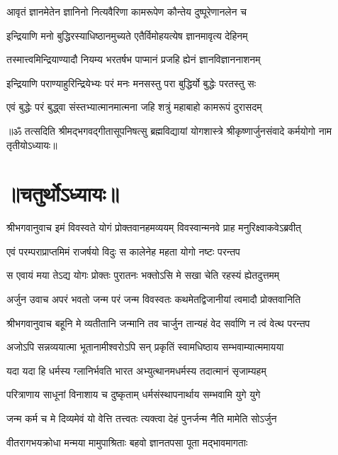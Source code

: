 \twolineshloka
{आवृतं ज्ञानमेतेन ज्ञानिनो नित्यवैरिणा}
{कामरूपेण कौन्तेय दुष्पूरेणानलेन च}%

\twolineshloka
{इन्द्रियाणि मनो बुद्धिरस्याधिष्ठानमुच्यते}
{एतैर्विमोहयत्येष ज्ञानमावृत्य देहिनम्}%

\twolineshloka
{तस्मात्त्वमिन्द्रियाण्यादौ नियम्य भरतर्षभ}
{पाप्मानं प्रजहि ह्येनं ज्ञानविज्ञाननाशनम्}%

\twolineshloka
{इन्द्रियाणि पराण्याहुरिन्द्रियेभ्यः परं मनः}
{मनसस्तु परा बुद्धिर्यो बुद्धेः परतस्तु सः}%

\twolineshloka
{एवं बुद्धेः परं बुद्ध्वा संस्तभ्यात्मानमात्मना}
{जहि शत्रुं महाबाहो कामरूपं दुरासदम्}%

{॥ॐ तत्सदिति श्रीमद्भगवद्गीतासूपनिषत्सु ब्रह्मविद्यायां योगशास्त्रे श्रीकृष्णार्जुनसंवादे कर्मयोगो नाम तृतीयोऽध्यायः॥}

\section{॥चतुर्थोऽध्यायः॥}
{श्रीभगवानुवाच}
\twolineshloka
{इमं विवस्वते योगं प्रोक्तवानहमव्ययम्}
{विवस्वान्मनवे प्राह मनुरिक्ष्वाकवेऽब्रवीत्}%

\twolineshloka
{एवं परम्पराप्राप्तमिमं राजर्षयो विदुः}
{स कालेनेह महता योगो नष्टः परन्तप}%

\twolineshloka
{स एवायं मया तेऽद्य योगः प्रोक्तः पुरातनः}
{भक्तोऽसि मे सखा चेति रहस्यं ह्येतदुत्तमम्}%

{अर्जुन उवाच}
\twolineshloka
{अपरं भवतो जन्म परं जन्म विवस्वतः}
{कथमेतद्विजानीयां त्वमादौ प्रोक्तवानिति}%

{श्रीभगवानुवाच}
\twolineshloka
{बहूनि मे व्यतीतानि जन्मानि तव चार्जुन}
{तान्यहं वेद सर्वाणि न त्वं वेत्थ परन्तप}%

\twolineshloka
{अजोऽपि सन्नव्ययात्मा भूतानामीश्वरोऽपि सन्}
{प्रकृतिं स्वामधिष्ठाय सम्भवाम्यात्ममायया}%

\twolineshloka
{यदा यदा हि धर्मस्य ग्लानिर्भवति भारत}
{अभ्युत्थानमधर्मस्य तदात्मानं सृजाम्यहम्}%

\twolineshloka
{परित्राणाय साधूनां विनाशाय च दुष्कृताम्}
{धर्मसंस्थापनार्थाय सम्भवामि युगे युगे}%

\twolineshloka
{जन्म कर्म च मे दिव्यमेवं यो वेत्ति तत्त्वतः}
{त्यक्त्वा देहं पुनर्जन्म नैति मामेति सोऽर्जुन}%

\twolineshloka
{वीतरागभयक्रोधा मन्मया मामुपाश्रिताः}
{बहवो ज्ञानतपसा पूता मद्भावमागताः}%

